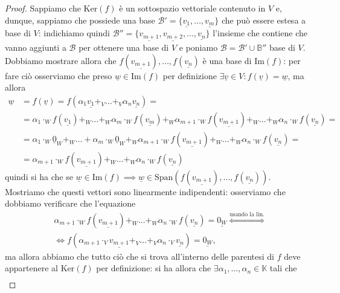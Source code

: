 \begin{proof}
  Sappiamo che $\text{Ker}(f)$ è un sottospazio vettoriale contenuto in $V$ e, dunque, sappiamo che possiede una base $\mathcal{B}' = \{ \underline{v_1}, \ldots, \underline{v_m} \}$ che può essere estesa a base di $V$: indichiamo quindi $\mathcal{B}'' = \{\underline{v_{m+1}}, \underline{v_{m+2}}, \ldots, \underline{v_n}\}$ l'insieme che contiene che vanno aggiunti a $\mathcal{B}$ per ottenere una base di $V$ e poniamo $\mathcal{B} = \mathcal{B}' \cup \mathbb{B}''$ base di $V$.
  Dobbiamo mostrare allora che $f(\underline{v_{m+1}}), \ldots, f(\underline{v_{n}})$ è una base di $\text{Im}(f)$: per fare ciò osserviamo che preso $\underline{w} \in \text{Im}(f)$ per definizione $\exists \underline{v} \in V : f(\underline{v}) = \underline{w}$, ma allora
  \begin{align}
  \underline{w} &= f(\underline{v}) = f(\alpha_1 \underline{v_1} +_V \ldots +_V \alpha_n \underline{v_n}) = \\
                &=\alpha_1 \cdot_W f(\underline{v_1}) +_W \ldots +_W \alpha_m \cdot_W f(\underline{v_m}) +_W \alpha_{m+1} \cdot_W f(\underline{v_{m+1}}) +_W \ldots +_W \alpha_n \cdot_W f(\underline{v_{n}}) = \\
                &=\alpha_1 \cdot_W \underline{0}_W +_W \ldots + \alpha_m \cdot_W \underline{0}_W +_W \alpha_{m+1} \cdot_W f(\underline{v_{m+1}}) +_W \ldots +_W \alpha_n \cdot_W f(\underline{v_n}) = \\
                &=\alpha_{m+1} \cdot_W f(\underline{v_{m+1}}) +_W \ldots +_W \alpha_n \cdot_W f(\underline{v_n})
  \end{align}
  quindi si ha che se $\underline{w} \in \text{Im}(f) \implies \underline{w} \in \text{Span}(f(\underline{v_{m+1}}), \ldots, f(\underline{v_{n}}))$. Mostriamo che questi vettori sono linearmente indipendenti: osserviamo che dobbiamo verificare che l'equazione
  \begin{align}
    &\alpha_{m+1} \cdot_W f(\underline{v_{m+1}}) +_W \ldots +_W \alpha_{n} \cdot_W f(\underline{v_n}) = \underline{0_W} \stackrel{\text{usando la lin.}}{\iff} \\
    &\iff f(\alpha_{m+1} \cdot_V \underline{v_{m+1}} +_V \ldots +_V \alpha_n \cdot_V \underline{v_n}) = \underline{0_W},
  \end{align}
  ma allora abbiamo che tutto ciò che si trova all'interno delle parentesi di $f$ deve appartenere al $\text{Ker}(f)$ per definizione: si ha allora che $\exists \alpha_1, \ldots, \alpha_n \in \mathbb{K}$ tali che
  \begin{align}

\end{align}
\end{proof}
